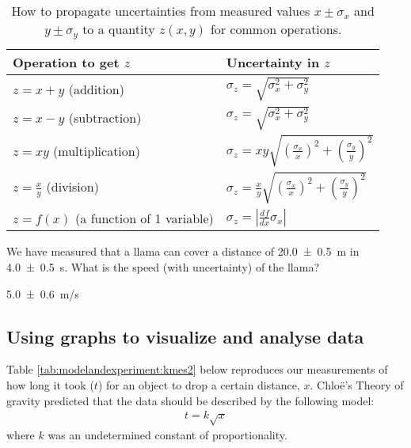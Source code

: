 \begin{table}[H]
\centering
\begin{tabular}{p{2.5in}p{2in}} 
\textbf{Operation to get $z$} &\textbf{Uncertainty in $z$} \\
\hline
\hline
$z=x+y$ (addition) &  $\sigma_z=\sqrt{\sigma_x^2+\sigma_y^2}$ \\ \hline
$z=x-y$ (subtraction) & $\sigma_z=\sqrt{\sigma_x^2+\sigma_y^2}$ \\ \hline
$z=xy$ (multiplication) & $\sigma_z=xy\sqrt{\left(\frac{\sigma_x}{x}\right)^2+\left(\frac{\sigma_y}{y}\right)^2}$ \\ \hline
$z=\frac{x}{y}$ (division) & $\sigma_z=\frac{x}{y}\sqrt{\left(\frac{\sigma_x}{x}\right)^2+\left(\frac{\sigma_y}{y}\right)^2}$ \\ \hline
$z=f(x)$ (a function of 1 variable) &$\sigma_z=\left|\frac{df}{dx}\sigma_x \right|$ \\ \hline
\end{tabular}
\caption{\label{tab:ModelAndExperiment:prop_uncertainties} How to propagate uncertainties from measured values $x\pm\sigma_x$ and $y\pm\sigma_y$ to a quantity $z(x,y)$ for common operations.}
\end{table}

\begin{checkpoint}{We have measured that a llama can cover a distance of \SI{20.0 \pm 0.5}{m} in \SI{4.0\pm 0.5}{s}. What is the speed (with uncertainty) of the llama?}
\begin{answer}
\SI{5.0 \pm 0.6}{m/s}
\end{answer}
\end{checkpoint}

\subsection{Using graphs to visualize and analyse data}
Table \ref{tab:modelandexperiment:kmes2} below reproduces our measurements of how long it took ($t$) for an object to drop a certain distance, $x$.  Chlo\"e's Theory of gravity predicted that the data should be described by the following model:
\begin{align*}
t = k \sqrt{x}
\end{align*}
where $k$ was an undetermined constant of proportionality.

